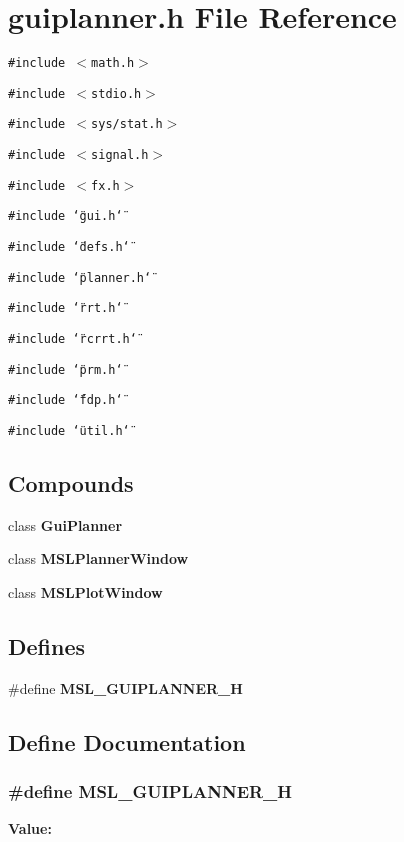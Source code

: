 \section{guiplanner.h File Reference}
\label{guiplanner_8h}
{\tt \#include $<$math.h$>$}\par
{\tt \#include $<$stdio.h$>$}\par
{\tt \#include $<$sys/stat.h$>$}\par
{\tt \#include $<$signal.h$>$}\par
{\tt \#include $<$fx.h$>$}\par
{\tt \#include \char`\"{}gui.h\char`\"{}}\par
{\tt \#include \char`\"{}defs.h\char`\"{}}\par
{\tt \#include \char`\"{}planner.h\char`\"{}}\par
{\tt \#include \char`\"{}rrt.h\char`\"{}}\par
{\tt \#include \char`\"{}rcrrt.h\char`\"{}}\par
{\tt \#include \char`\"{}prm.h\char`\"{}}\par
{\tt \#include \char`\"{}fdp.h\char`\"{}}\par
{\tt \#include \char`\"{}util.h\char`\"{}}\par
\subsection*{Compounds}
\begin{CompactItemize}
\item 
class {\bf Gui\-Planner}
\item 
class {\bf MSLPlanner\-Window}
\item 
class {\bf MSLPlot\-Window}
\end{CompactItemize}
\subsection*{Defines}
\begin{CompactItemize}
\item 
\#define {\bf MSL\_\-GUIPLANNER\_\-H}
\end{CompactItemize}


\subsection{Define Documentation}
\subsubsection{\setlength{\rightskip}{0pt plus 5cm}\#define MSL\_\-GUIPLANNER\_\-H}\label{guiplanner_8h_a0}


{\bf Value:}\footnotesize\begin{verbatim}
\end{verbatim}\normalsize 
